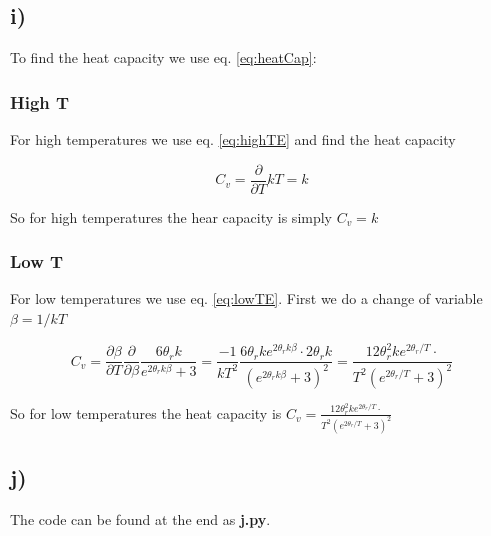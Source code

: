 \documentclass[a4paper,norsk, 10pt]{article}
\newcommand{\pd}[2]{\frac{\partial #1}{\partial #2}}
\begin{document}
\subsection{i)}

To find the heat capacity we use eq. \eqref{eq:heatCap}:

\subsubsection{High T}
For high temperatures we use eq. \eqref{eq:highTE} and find the heat capacity

\begin{equation}
C_v = \pd{}{T} kT = k
\end{equation}

So for high temperatures the hear capacity is simply $C_v = k$

\subsubsection{Low T}
For low temperatures we use eq. \eqref{eq:lowTE}. First we do a change of variable $\beta = 1/kT$

\begin{equation}
C_v = \pd{\beta}{T}\pd{}{\beta} \frac{6\theta_r k}{e^{2\theta_rk\beta} + 3} = \frac{-1}{kT^2}\frac{6\theta_r k e^{2\theta_rk\beta}\cdot 2\theta_r k }{\left(e^{2\theta_rk\beta} + 3\right)^2} = 
\frac{12\theta_r^2 k e^{2\theta_r/T}\cdot  }{T^2\left(e^{2\theta_r/T} + 3\right)^2}
\end{equation}

So for low temperatures the heat capacity is $C_v = \frac{12\theta_r^2 k e^{2\theta_r/T}\cdot  }{T^2\left(e^{2\theta_r/T} + 3\right)^2}$

\subsection{j)}
The code can be found at the end as \textbf{j.py}.
\end{document}
